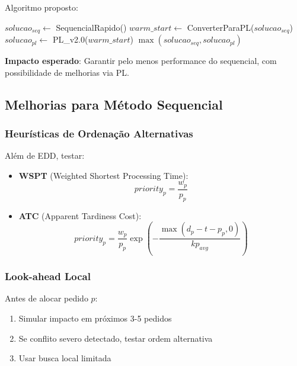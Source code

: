 \documentclass[12pt,a4paper]{article}
\theoremstyle{definition}
\begin{document}
Algoritmo proposto:

\begin{algorithm}[H]
\caption{Método Híbrido}
\begin{algorithmic}[1]
\STATE $solucao_{seq} \leftarrow$ SequencialRapido()
\STATE $warm\_start \leftarrow$ ConverterParaPL($solucao_{seq}$)
\STATE $solucao_{pl} \leftarrow$ PL\_v2.0($warm\_start$)
\RETURN $\max(solucao_{seq}, solucao_{pl})$
\end{algorithmic}
\end{algorithm}

\textbf{Impacto esperado}: Garantir pelo menos performance do sequencial, com possibilidade de melhorias via PL.

\subsection{Melhorias para Método Sequencial}

\subsubsection{Heurísticas de Ordenação Alternativas}

Além de EDD, testar:

\begin{itemize}
    \item \textbf{WSPT} (Weighted Shortest Processing Time):
    \begin{equation}
    priority_p = \frac{w_p}{p_p}
    \end{equation}

    \item \textbf{ATC} (Apparent Tardiness Cost):
    \begin{equation}
    priority_p = \frac{w_p}{p_p} \exp\left(-\frac{\max(d_p - t - p_p, 0)}{kp_{avg}}\right)
    \end{equation}
\end{itemize}

\subsubsection{Look-ahead Local}

Antes de alocar pedido $p$:
\begin{enumerate}
    \item Simular impacto em próximos 3-5 pedidos
    \item Se conflito severo detectado, testar ordem alternativa
    \item Usar busca local limitada
\end{enumerate}
\end{document}
